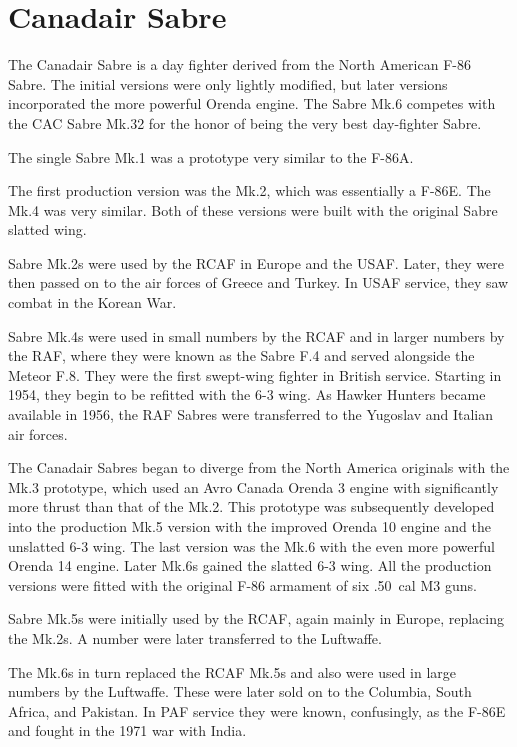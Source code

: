 \section*{Canadair Sabre}

The Canadair Sabre is a day fighter derived from the North American F-86 Sabre. The initial versions were only lightly modified, but later versions incorporated the more powerful Orenda engine. The Sabre Mk.6 competes with the CAC Sabre Mk.32  for the honor of being the very best day-fighter Sabre.

The single Sabre Mk.1 was a prototype very similar to the F-86A. 

The first production version was the Mk.2, which was essentially a F-86E. The Mk.4 was very similar. Both of these versions were built with the original Sabre slatted wing. 

Sabre Mk.2s were used by the RCAF in Europe and the USAF. Later, they were then passed on to the air forces of Greece and Turkey. In USAF service, they saw combat in the Korean War.

Sabre Mk.4s were used in small numbers by the RCAF and in larger numbers by the RAF, where they were known as the Sabre F.4 and served alongside the Meteor F.8. They were the first swept-wing fighter in British service. Starting in 1954, they begin to be refitted with the 6-3 wing. As Hawker Hunters became available in 1956, the RAF Sabres were transferred to the Yugoslav and Italian air forces.

The Canadair Sabres began to diverge from the North America originals with the Mk.3 prototype, which used an Avro Canada Orenda 3 engine with significantly more thrust than that of the Mk.2. This prototype was subsequently developed into the production Mk.5 version with the improved Orenda 10 engine and the unslatted 6-3 wing. The last version was the Mk.6 with the even more powerful Orenda 14 engine. Later Mk.6s gained the slatted 6-3 wing. All the production versions were fitted with the original F-86 armament of six .50~cal M3 guns.

Sabre Mk.5s were initially used by the RCAF, again mainly in Europe, replacing the Mk.2s. A number were later transferred to the Luftwaffe.

The Mk.6s in turn replaced the RCAF Mk.5s and also were used in large numbers by the Luftwaffe. These were later sold on to the Columbia, South Africa, and Pakistan. In PAF service they were known, confusingly, as the F-86E and fought in the 1971 war with India.

